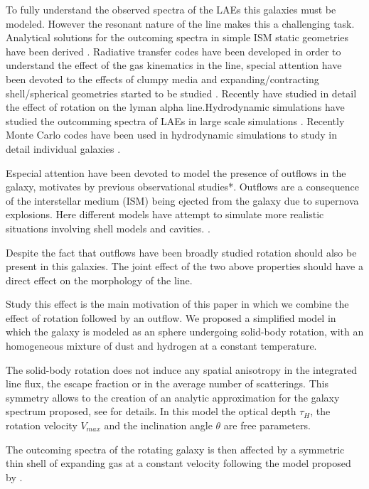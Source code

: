 \documentclass{latex/emulateapj}
\begin{document}
To fully understand the observed spectra of the LAEs this galaxies must be modeled. However the resonant nature of the line makes this a challenging task. Analytical solutions for the outcoming spectra in simple ISM static
geometries have been derived \cite{Adams72, Harrington73, Neufeld90, Dijkstra06}. Radiative transfer codes \citep{DijkstraKramer, Laursen09, Verhamme06, CLARA} have been developed in order to understand the effect of the gas kinematics in the \lya line, special attention have been devoted to  the effects of clumpy media \citep{Hansen06} and expanding/contracting shell/spherical geometries started to be studied \citep{Ahn03,Verhamme06,Dijkstra06}. Recently \cite{Garavito14} have studied in detail the effect of rotation on the lyman alpha line.Hydrodynamic simulations have studied the outcomming spectra of LAEs in large scale simulations \cite{Forero12}. Recently Monte Carlo codes have been used in hydrodynamic simulations to study in detail individual galaxies \citep{Laursen09,Barnes11,Verhamme12,Yajima12}.


Especial attention have been devoted to model the presence of outflows in the galaxy, motivates by previous observational studies*. Outflows are a consequence of the interstellar medium (ISM) being ejected from the galaxy due to supernova explosions. Here different models have attempt to simulate more realistic situations involving shell models and cavities. \citep{Behrens2014}. 

Despite the fact that outflows have been broadly studied rotation should also be present in this galaxies. The joint 
effect of the two above properties should have a direct effect on the morphology of the \lya line. 

Study this effect is the main motivation of this paper in which we combine the effect of rotation followed by an outflow. We proposed a simplified model in which the galaxy is modeled as an sphere undergoing solid-body rotation, with an homogeneous mixture of dust and hydrogen at a constant temperature.    

The solid-body rotation does not induce any spatial anisotropy in the integrated line flux,  the escape fraction or in the average number of scatterings. This symmetry allows to the creation of an analytic approximation for the galaxy spectrum  proposed, see \cite{Garavito14} for details. In this model the optical depth $\tau_{H}$, the  rotation velocity $V_{max}$ and the inclination angle $\theta$ are free parameters. 
 
The outcoming spectra of the rotating galaxy is then affected by a symmetric thin shell of expanding gas at a constant velocity following the model proposed by \cite{2014arXiv1404.2958V, Orsi12}.    
\end{document}
